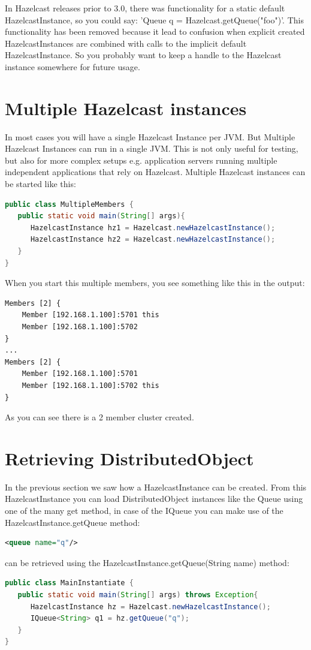 In Hazelcast releases prior to 3.0, there was functionality for a static default HazelcastInstance, so you could say: 'Queue q = Hazelcast.getQueue("foo")'. This functionality has been removed because it lead to confusion when explicit created HazelcastInstances are combined with calls to the implicit default HazelcastInstance. So you probably want to keep a handle to the Hazelcast instance somewhere for future usage.

\section{Multiple Hazelcast instances}
In most cases you will have a single Hazelcast Instance per JVM. But Multiple Hazelcast Instances can run in a single JVM. This is not only useful for testing, but also for more complex setups e.g. application servers running multiple independent applications that rely on Hazelcast. Multiple Hazelcast instances can be started like this:
\begin{lstlisting}[language=java]
public class MultipleMembers {
   public static void main(String[] args){
      HazelcastInstance hz1 = Hazelcast.newHazelcastInstance();
      HazelcastInstance hz2 = Hazelcast.newHazelcastInstance();
   }
}
\end{lstlisting}
When you start this multiple members, you see something like this in the output:
\begin{lstlisting}
Members [2] {
    Member [192.168.1.100]:5701 this
    Member [192.168.1.100]:5702
}
...
Members [2] {
    Member [192.168.1.100]:5701
    Member [192.168.1.100]:5702 this
}
\end{lstlisting}
As you can see there is a 2 member cluster created.

\section{Retrieving DistributedObject}
In the previous section we saw how a HazelcastInstance can be created. From this HazelcastInstance you can load DistributedObject instances like the Queue using one of the many get method, in case of the IQueue you can make use of the HazelcastInstance.getQueue method:
\begin{lstlisting}[language=xml]
<queue name="q"/>
\end{lstlisting}
can be retrieved using the HazelcastInstance.getQueue(String name) method:
\begin{lstlisting}[language=java]
public class MainInstantiate {
   public static void main(String[] args) throws Exception{
      HazelcastInstance hz = Hazelcast.newHazelcastInstance();
      IQueue<String> q1 = hz.getQueue("q");
   }
}
\end{lstlisting}

